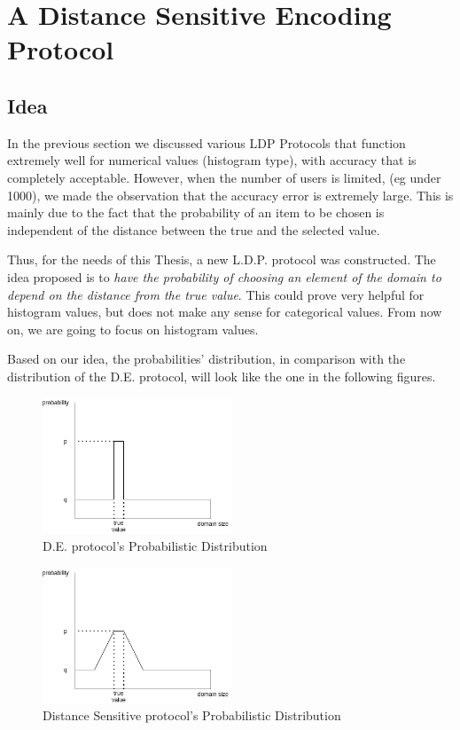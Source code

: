\section{A Distance Sensitive Encoding Protocol}

\subsection{Idea}

In the previous section we discussed various LDP Protocols that function extremely well for numerical values (histogram type), with accuracy that is completely acceptable. However, when the number of users is limited, (eg under 1000), we made the observation that the accuracy error is extremely large. This is mainly due to the fact that the probability of an item to be chosen is independent of the distance between the true and the selected value.


Thus, for the needs of this Thesis, a new L.D.P. protocol was constructed. The idea proposed is to \emph{have the probability of choosing an element of the domain to depend on the distance from the true value}. This could prove very helpful for histogram values, but does not make any sense for categorical values. From now on, we are going to focus on histogram values.

Based on our idea, the probabilities' distribution, in comparison with the distribution of the D.E. protocol, will look like the one in the following figures.

\begin{figure}[!htb]\centering
    \includegraphics[width=0.5\textwidth]{images/D.E. Idea.png}
    \caption{D.E. protocol's Probabilistic Distribution}
\end{figure}

\begin{figure}[!htb]\centering
    \includegraphics[width=0.5\textwidth]{images/Our Idea.png}
    \caption{Distance Sensitive protocol's Probabilistic Distribution}
\end{figure}


